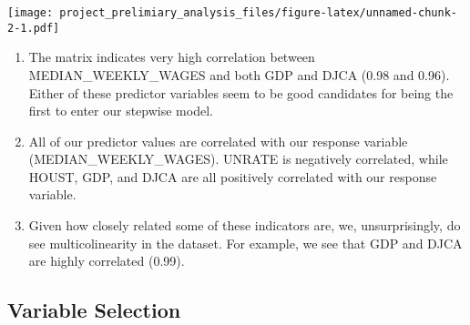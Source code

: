 \documentclass[
]{article}
\newenvironment{Shaded}{\begin{snugshade}}{\end{snugshade}}
\newcommand{\AttributeTok}[1]{\textcolor[rgb]{0.77,0.63,0.00}{#1}}
\newcommand{\ConstantTok}[1]{\textcolor[rgb]{0.00,0.00,0.00}{#1}}
\newcommand{\FunctionTok}[1]{\textcolor[rgb]{0.00,0.00,0.00}{#1}}
\newcommand{\NormalTok}[1]{#1}
\newcommand{\OtherTok}[1]{\textcolor[rgb]{0.56,0.35,0.01}{#1}}
\newcommand{\SpecialCharTok}[1]{\textcolor[rgb]{0.00,0.00,0.00}{#1}}
\newcommand{\StringTok}[1]{\textcolor[rgb]{0.31,0.60,0.02}{#1}}
\begin{document}
\begin{Shaded}
\end{Shaded}

\texttt{[image: project\_prelimiary\_analysis\_files/figure-latex/unnamed-chunk-2-1.pdf]}

\begin{enumerate}
\def\labelenumi{\arabic{enumi}.}
\setcounter{enumi}{1}
\item
  The matrix indicates very high correlation between
  MEDIAN\_WEEKLY\_WAGES and both GDP and DJCA (0.98 and 0.96). Either of
  these predictor variables seem to be good candidates for being the
  first to enter our stepwise model.
\item
  All of our predictor values are correlated with our response variable
  (MEDIAN\_WEEKLY\_WAGES). UNRATE is negatively correlated, while HOUST,
  GDP, and DJCA are all positively correlated with our response
  variable.
\item
  Given how closely related some of these indicators are, we,
  unsurprisingly, do see multicolinearity in the dataset. For example,
  we see that GDP and DJCA are highly correlated (0.99).
\end{enumerate}

\hypertarget{variable-selection}{%
\subsection{Variable Selection}\label{variable-selection}}
\end{document}
